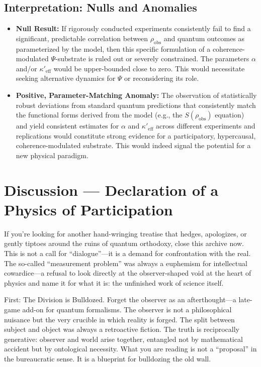 \documentclass[11pt, a4paper]{book}
\begin{document}
\subsection{Interpretation: Nulls and Anomalies}
\label{ssec:empiricalpredictions_interpretation}
\begin{itemize}
    \item \textbf{Null Result:} If rigorously conducted experiments consistently fail to find a significant, predictable correlation between $\rho_{\text{obs}}$ and quantum outcomes as parameterized by the model, then this specific formulation of a coherence-modulated $\Psi$-substrate is ruled out or severely constrained. The parameters $\alpha$ and/or $\kappa'_{\text{eff}}$ would be upper-bounded close to zero. This would necessitate seeking alternative dynamics for $\Psi$ or reconsidering its role.
    \item \textbf{Positive, Parameter-Matching Anomaly:} The observation of statistically robust deviations from standard quantum predictions that consistently match the functional forms derived from the model (e.g., the $S(\rho_{\text{obs}})$ equation) and yield consistent estimates for $\alpha$ and $\kappa'_{\text{eff}}$ across different experiments and replications would constitute strong evidence for a participatory, hypercausal, coherence-modulated substrate. This would indeed signal the potential for a new physical paradigm.
\end{itemize}

\section{Discussion — Declaration of a Physics of Participation}
\label{sec:discussion}
If you’re looking for another hand-wringing treatise that hedges, apologizes, or gently tiptoes around the ruins of quantum orthodoxy, close this archive now. This is not a call for “dialogue”—it is a demand for confrontation with the real. The so-called “measurement problem” was always a euphemism for intellectual cowardice—a refusal to look directly at the observer-shaped void at the heart of physics and name it for what it is: the unfinished work of science itself.

First: The Division is Bulldozed.
Forget the observer as an afterthought—a late-game add-on for quantum formalisms. The observer is not a philosophical nuisance but the very crucible in which reality is forged. The split between subject and object was always a retroactive fiction. The truth is reciprocally generative: observer and world arise together, entangled not by mathematical accident but by ontological necessity. What you are reading is not a “proposal” in the bureaucratic sense. It is a blueprint for bulldozing the old wall.
\end{document}
